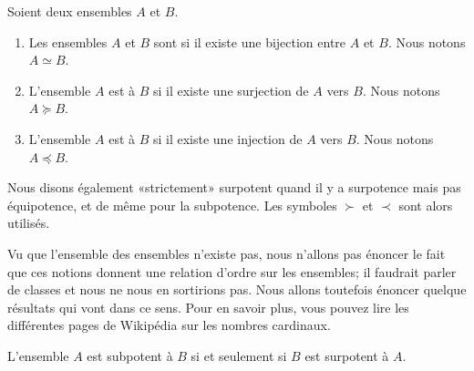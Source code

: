 \begin{definition}      \label{DEFooXGXZooIgcBCg}
    Soient deux ensembles \( A\) et \( B\).
    \begin{enumerate}
        \item
            Les ensembles \( A\) et \( B\) sont  si il existe une bijection entre \( A\) et \( B\). Nous notons \( A\simeq B\).
        \item
            L'ensemble \( A\) est  à \( B\) si il existe une surjection de \( A\) vers \( B\). Nous notons \( A\succeq B\).
        \item
            L'ensemble \( A\) est  à \( B\) si il existe une injection de \( A\) vers \( B\). Nous notons \( A\preceq B\).
    \end{enumerate}
    Nous disons également «strictement» surpotent quand il y a surpotence mais pas équipotence, et de même pour la subpotence. Les symboles \( \succ\) et \( \prec\) sont alors utilisés.
\end{definition}
Vu que l'ensemble des ensembles n'existe pas, nous n'allons pas énoncer le fait que ces notions donnent une relation d'ordre sur les ensembles; il faudrait parler de classes et nous ne nous en sortirions pas. Nous allons toutefois énoncer quelque résultats qui vont dans ce sens. Pour en savoir plus, vous pouvez lire les différentes pages de Wikipédia sur les nombres cardinaux.

\begin{proposition}
    L'ensemble \( A\) est subpotent à \( B\) si et seulement si \( B\) est surpotent à \( A\).
\end{proposition}

